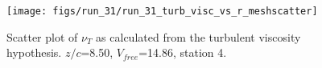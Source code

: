 \begin{figure}[H]
\centering
\texttt{[image: figs/run\_31/run\_31\_turb\_visc\_vs\_r\_meshscatter]}
\caption{Scatter plot of $\nu_T$ as calculated from the turbulent viscosity hypothesis. $z/c$=8.50, $V_{free}$=14.86, station 4.}
\label{fig:run_31_turb_visc_vs_r_meshscatter}
\end{figure}


